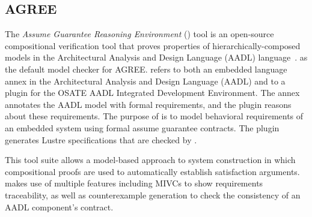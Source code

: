 \subsection{AGREE}

The {\em Assume Guarantee Reasoning Environment} (\agree) tool is
an open-source compositional verification tool that proves properties
of hierarchically-composed models in the Architectural Analysis and
Design Language (AADL) language~\cite{NFM2012:CoGaMiWhLaLu,QFCS15:backes,hilt2013}.
\jkind as the default model checker for AGREE.  \agree
refers to both an embedded language annex in the Architectural
Analysis and Design Language (AADL) and to a plugin for the OSATE AADL
Integrated Development Environment. The \agree annex annotates the
AADL model with formal requirements, and the plugin reasons about
these requirements. The purpose of \agree is to model behavioral
requirements of an embedded system using formal assume guarantee
contracts. The plugin generates Lustre specifications that are checked
by \jkind.

This tool suite allows a model-based approach to system construction in which compositional proofs are used to automatically establish satisfaction arguments.
\agree makes use of multiple \jkind features including MIVCs to show requirements traceability, as well as counterexample generation to check the consistency of an AADL
component's contract.



%

